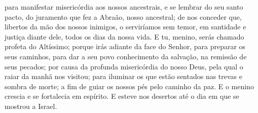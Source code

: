 {  para manifestar misericórdia aos nossos ancestrais,
 e se lembrar do seu santo pacto,
  do juramento que fez a Abraão, nosso ancestral;
  de nos conceder que, libertos da mão dos nossos inimigos, o serviríamos sem temor,
  em santidade e justiça diante dele, todos os dias da nossa vida.
  E tu, menino, serás chamado profeta do Altíssimo; porque irás adiante da face do Senhor, para preparar os seus caminhos,
  para dar a seu povo conhecimento da salvação, na remissão de seus pecados;
  por causa da profunda misericórdia
 do nosso Deus, pela qual o raiar da manhã nos visitou;
  para iluminar os que estão sentados nas trevas e sombra de morte; a fim de guiar os nossos pés pelo caminho da paz.
  E o menino crescia e se fortalecia em espírito. E esteve nos desertos até o dia em que se mostrou a Israel.
\par }

